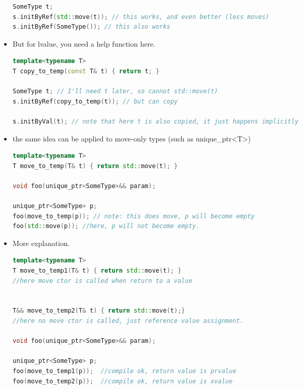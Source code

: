 \documentclass[a4paper,12pt,twoside]{book}
\begin{document}
\begin{itemize}
\begin{lstlisting}[frame=single, language=c++]
SomeType t;
s.initByRef(std::move(t)); // this works, and even better (less moves)
s.initByRef(SomeType()); // this also works
\end{lstlisting}

\item But for lvalue, you need a help function here.
\begin{lstlisting}[frame=single, language=c++]
template<typename T>
T copy_to_temp(const T& t) { return t; }

SomeType t; // I'll need t later, so cannot std::move(t)
s.initByRef(copy_to_temp(t)); // but can copy

s.initByVal(t); // note that here t is also copied, it just happens implicitly
\end{lstlisting}

\item the same idea can be applied to move-only types (such as unique\_ptr<T>)
\begin{lstlisting}[frame=single, language=c++]
template<typename T>
T move_to_temp(T& t) { return std::move(t); }

void foo(unique_ptr<SomeType>&& param);

unique_ptr<SomeType> p;
foo(move_to_temp(p)); // note: this does move, p will become empty
foo(std::move(p)); //here, p will not become empty. 
\end{lstlisting}


\item More explanation.
\begin{lstlisting}[frame=single, language=c++]
template<typename T>
T move_to_temp1(T& t) { return std::move(t); }
//here move ctor is called when return to a value


T&& move_to_temp2(T& t) { return std::move(t);}
//here no move ctor is called, just reference value assignment.

void foo(unique_ptr<SomeType>&& param);

unique_ptr<SomeType> p;
foo(move_to_temp1(p));  //compile ok, return value is prvalue
foo(move_to_temp2(p));  //compile ok, return value is xvalue
\end{lstlisting}

\end{itemize}
\end{document}
